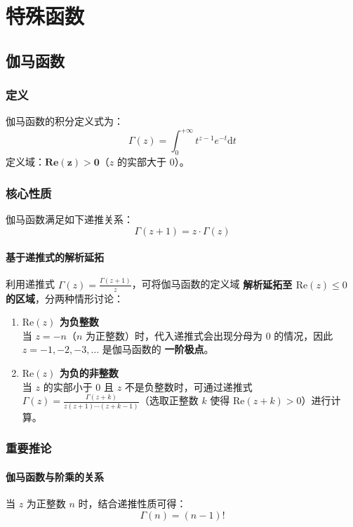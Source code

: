 \documentclass{article}
\begin{document}
	
	\section{特殊函数}
	
	\subsection{伽马函数}
	
	\subsubsection{定义}
	伽马函数的积分定义式为：
	\[
	\Gamma(z)=\int_{0}^{+\infty}t^{z-1}e^{-t}\mathrm{d}t
	\]
	定义域：$\boldsymbol{\text{Re}(z)>0}$（$z$ 的实部大于 0）。
	
	\subsubsection{核心性质}
	伽马函数满足如下递推关系：
	\[
	\Gamma(z+1)=z\cdot\Gamma(z)
	\]
	
	\paragraph{基于递推式的解析延拓}
	利用递推式 $\Gamma(z)=\frac{\Gamma(z+1)}{z}$，可将伽马函数的定义域 \textbf{解析延拓至 $\text{Re}(z)\leq0$ 的区域}，分两种情形讨论：
	\begin{enumerate}[label=\arabic*., leftmargin=2em, itemsep=0.3em]
		\item \textbf{$\text{Re}(z)$ 为负整数} \\
		当 $z=-n$（$n$ 为正整数）时，代入递推式会出现分母为 0 的情况，因此 $z=-1,-2,-3,\dots$ 是伽马函数的 \textbf{一阶极点}。
		\item \textbf{$\text{Re}(z)$ 为负的非整数} \\
		当 $z$ 的实部小于 0 且 $z$ 不是负整数时，可通过递推式 $\Gamma(z)=\frac{\Gamma(z+k)}{z(z+1)\cdots(z+k-1)}$（选取正整数 $k$ 使得 $\text{Re}(z+k)>0$）进行计算。
	\end{enumerate}
	
	\subsubsection{重要推论}
	\paragraph{伽马函数与阶乘的关系}
	当 $z$ 为正整数 $n$ 时，结合递推性质可得：
	\[
	\Gamma(n)=(n-1)!
	\]
	
\end{document}
